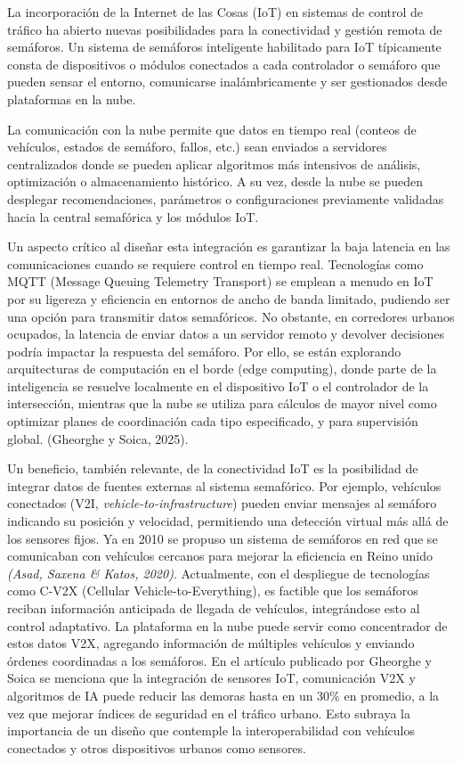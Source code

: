 \documentclass[12pt,a4paper,oneside]{report}
\begin{document}
La incorporación de la Internet de las Cosas (IoT) en sistemas de control de tráfico ha abierto nuevas posibilidades para la conectividad y gestión remota de semáforos. Un sistema de semáforos inteligente habilitado para IoT típicamente consta de dispositivos o módulos conectados a cada controlador o semáforo que pueden sensar el entorno, comunicarse inalámbricamente y ser gestionados desde plataformas en la nube.

La comunicación con la nube permite que datos en tiempo real (conteos de vehículos, estados de semáforo, fallos, etc.) sean enviados a servidores centralizados donde se pueden aplicar algoritmos más intensivos de análisis, optimización o almacenamiento histórico. A su vez, desde la nube se pueden desplegar recomendaciones, parámetros o configuraciones previamente validadas hacia la central semafórica y los módulos IoT.

Un aspecto crítico al diseñar esta integración es garantizar la baja latencia en las comunicaciones cuando se requiere control en tiempo real. Tecnologías como MQTT (Message Queuing Telemetry Transport) se emplean a menudo en IoT por su ligereza y eficiencia en entornos de ancho de banda limitado, pudiendo ser una opción para transmitir datos semafóricos. No obstante, en corredores urbanos ocupados, la latencia de enviar datos a un servidor remoto y devolver decisiones podría impactar la respuesta del semáforo. Por ello, se están explorando arquitecturas de computación en el borde (edge computing), donde parte de la inteligencia se resuelve localmente en el dispositivo IoT o el controlador de la intersección, mientras que la nube se utiliza para cálculos de mayor nivel como optimizar planes de coordinación cada tipo especificado, y para supervisión global. (Gheorghe y Soica, 2025).

Un beneficio, también relevante, de la conectividad IoT es la posibilidad de integrar datos de fuentes externas al sistema semafórico. Por ejemplo, vehículos conectados (V2I, \emph{vehicle-to-infrastructure}) pueden enviar mensajes al semáforo indicando su posición y velocidad, permitiendo una detección virtual más allá de los sensores fijos. Ya en 2010 se propuso un sistema de semáforos en red que se comunicaban con vehículos cercanos para mejorar la eficiencia en Reino unido \emph{(Asad, Saxena \& Katos, 2020)}. Actualmente, con el despliegue de tecnologías como C-V2X (Cellular Vehicle-to-Everything), es factible que los semáforos reciban información anticipada de llegada de vehículos, integrándose esto al control adaptativo. La plataforma en la nube puede servir como concentrador de estos datos V2X, agregando información de múltiples vehículos y enviando órdenes coordinadas a los semáforos. En el artículo publicado por Gheorghe y Soica se menciona que la integración de sensores IoT, comunicación V2X y algoritmos de IA puede reducir las demoras hasta en un 30\% en promedio, a la vez que mejorar índices de seguridad en el tráfico urbano\hspace{0pt}. Esto subraya la importancia de un diseño que contemple la interoperabilidad con vehículos conectados y otros dispositivos urbanos como sensores.
\end{document}
